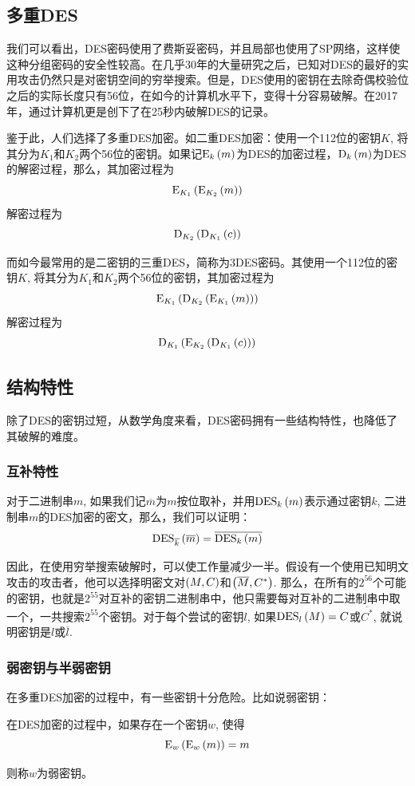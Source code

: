 \subsection{多重DES}
我们可以看出，DES密码使用了费斯妥密码，并且局部也使用了SP网络，这样使这种分组密码的安全性较高。在几乎30年的大量研究之后，已知对DES的最好的实用攻击仍然只是对密钥空间的穷举搜索。但是，DES使用的密钥在去除奇偶校验位之后的实际长度只有56位，在如今的计算机水平下，变得十分容易破解。在2017年，通过计算机更是创下了在25秒内破解DES的记录。\par
鉴于此，人们选择了多重DES加密。如二重DES加密：使用一个112位的密钥$K$, 将其分为$K_1$和$K_2$两个56位的密钥。如果记$\mathrm{E}_k\left( {m}\right)$为DES的加密过程，$\mathrm{D}_k\left( {m}\right)$为DES的解密过程，那么，其加密过程为
\[\mathrm{E}_{K_1}\left( {\mathrm{E}_{K_2}\left( {m}\right)}\right)\]
解密过程为
\[\mathrm{D}_{K_2}\left( {\mathrm{D}_{K_1}\left( {c}\right)}\right)\]

而如今最常用的是二密钥的三重DES，简称为3DES密码。其使用一个112位的密钥$K$, 将其分为$K_1$和$K_2$两个56位的密钥，其加密过程为
\[\mathrm{E}_{K_1}\left( {\mathrm{D}_{K_2}\left( {\mathrm{E}_{K_1}\left( {m}\right)}\right)}\right)\]
解密过程为
\[\mathrm{D}_{K_1}\left( {\mathrm{E}_{K_2}\left( {\mathrm{D}_{K_1}\left( {c}\right)}\right)}\right)\]
\subsection{结构特性}
除了DES的密钥过短，从数学角度来看，DES密码拥有一些结构特性，也降低了其破解的难度。
\subsubsection{互补特性}
对于二进制串$m$, 如果我们记$\overline{m}$为$m$按位取补，并用$\mathrm{DES}_k\left( {m}\right)$表示通过密钥$k$, 二进制串$m$的DES加密的密文，那么，我们可以证明：
\begin{equation}
\mathrm{DES}_{\overline{k}}\left( {\overline{m}}\right)=\overline{\mathrm{DES}_k\left( {m}\right)}
\end{equation}

因此，在使用穷举搜索破解时，可以使工作量减少一半。假设有一个使用已知明文攻击的攻击者，他可以选择明密文对$\left( {M, C}\right)$和$\left( {\overline{M}, C^*}\right)$. 那么，在所有的$2^{56}$个可能的密钥，也就是$2^{55}$对互补的密钥二进制串中，他只需要每对互补的二进制串中取一个，一共搜索$2^{55}$个密钥。对于每个尝试的密钥$l$, 如果$\mathrm{DES}_{l}\left( {M}\right)=C$或$\overline{C^*}$, 就说明密钥是$l$或$\overline{l}$.
\subsubsection{弱密钥与半弱密钥}
在多重DES加密的过程中，有一些密钥十分危险。比如说弱密钥：
\begin{Definition}
在DES加密的过程中，如果存在一个密钥$w$, 使得
\begin{equation}\label{weakKey}
\mathrm{E}_w\left( {\mathrm{E}_w\left( {m}\right)}\right)=m
\end{equation}

则称$w$为弱密钥。
\end{Definition}

